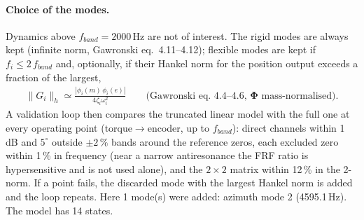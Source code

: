 \documentclass[10pt,a4paper]{article}
\numberwithin{equation}{section}
\begin{document}
\paragraph{Choice of the modes.} Dynamics above $f_{band} = 2000$\,Hz are not of interest. The rigid modes are always kept (infinite norm, Gawronski eq.~4.11--4.12); flexible modes are kept if $f_i \le 2\,f_{band}$ and, optionally, if their Hankel norm for the position output exceeds a fraction of the largest,
\begin{gather}
\|G_i\|_h \simeq \frac{|\phi_i(m)\,\phi_i(e)|}{4\zeta_i\omega_i^2}\qquad\text{(Gawronski eq.~4.4--4.6, $\boldsymbol\Phi$ mass-normalised).}
\end{gather}
A validation loop then compares the truncated linear model with the full one at every operating point (torque$\to$encoder, up to $f_{band}$): direct channels within 1\,dB and $5^\circ$ outside $\pm2\,\%$ bands around the reference zeros, each excluded zero within 1\,\% in frequency (near a narrow antiresonance the FRF ratio is hypersensitive and is not used alone), and the $2\times2$ matrix within 12\,\% in the 2-norm. If a point fails, the discarded mode with the largest Hankel norm is added and the loop repeats. Here 1 mode(s) were added: azimuth mode 2 (4595.1\,Hz). The model has 14 states.
\end{document}
